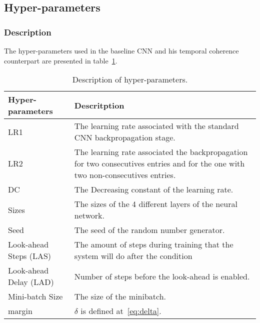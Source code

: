 \subsection{Hyper-parameters}
\subsubsection{Description}
The hyper-parameters used in the baseline CNN and his temporal coherence counterpart are presented in table~\ref{tab:hyperparams}.

\begin{table}[h]
\center
\begin{tabular}{@{}lp{8cm}@{}}
\toprule
Hyper-parameters       & Descritption                                                                                                                     \\ \midrule
LR1                    & The learning rate associated with the standard CNN backpropagation stage.                                                        \\
LR2                    & The learning rate associated the backpropagation for two consecutives entries and for the one with two non-consecutives entries. \\
DC                     & The Decreasing constant of the learning rate. \\
Sizes                  & The sizes of the 4 different layers of the neural network.                                                                       \\
Seed                   & The seed of the random number generator. \\
Look-ahead Steps (LAS) & The amount of steps during training that the system will do after the condition                                                  \\
Look-ahead Delay (LAD) & Number of steps before the look-ahead is enabled.                                                                                \\
Mini-batch Size        & The size of the minibatch.                                                                                                       \\
margin                 & $\delta$ is defined at~\ref{eq:delta}.                                                                                         \\ \bottomrule
\end{tabular}
\caption{Description of hyper-parameters.}
\label{tab:hyperparams}
\end{table}

